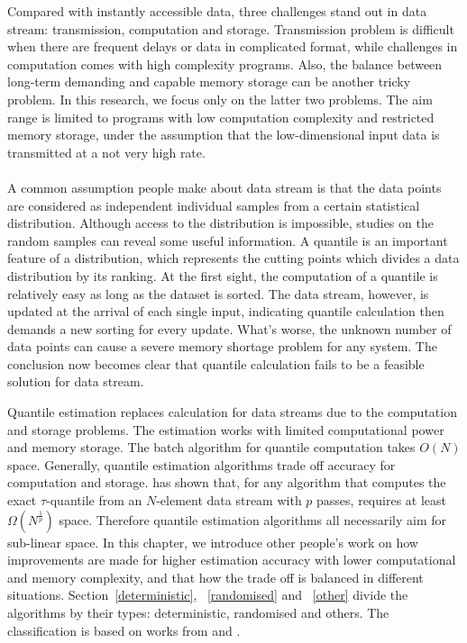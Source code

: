 Compared with instantly accessible data, three challenges stand out in data stream: transmission, computation and storage\cite{muthukrishnanDataStreamsAlgorithms2005}.
Transmission problem is difficult when there are frequent delays or data in complicated format,
while challenges in computation comes with high complexity programs. Also, the balance between long-term demanding and capable memory storage can be another tricky problem.
In this research, we focus only on the latter two problems. The aim range is limited to programs with low computation complexity and restricted memory storage, under the assumption that the low-dimensional input data is transmitted at a not very high rate.
\\\\
A common assumption people make about data stream is that the data points are considered as independent individual samples from a certain statistical distribution. 
Although access to the distribution is impossible, studies on the random samples can reveal some useful information. 
A quantile is an important feature of a distribution, which represents the cutting points which divides a data distribution by its ranking.
At the first sight, the computation of a quantile is relatively easy as long as the dataset is sorted.
The data stream, however, is updated at the arrival of each single input, indicating quantile calculation then demands a new sorting for every update.
What's worse, the unknown number of data points can cause a severe memory shortage problem for any system. 
The conclusion now becomes clear that quantile calculation fails to be a feasible solution for data stream.

Quantile estimation replaces calculation for data streams due to the computation and storage problems.
The estimation works with limited computational power and memory storage.
The batch algorithm for quantile computation takes $O(N)$ space.
Generally, quantile estimation algorithms trade off accuracy for computation and storage.
\citeauthor{munroSelectionSortingLimited1980} \cite{munroSelectionSortingLimited1980} has shown that, for any algorithm that computes the exact $\tau$-quantile from an $N$-element data stream with $p$ passes, requires at least $\Omega(N^{\frac{1}{p}})$ space.
Therefore quantile estimation algorithms all necessarily aim for sub-linear space.
In this chapter, we introduce other people's work on how improvements are made for higher estimation accuracy with lower computational and memory complexity, and that how the trade off is balanced in different situations. Section~\ref{deterministic}, ~\ref{randomised} and ~\ref{other} divide the algorithms by their types: deterministic, randomised and others. The classification is based on works from \citeauthor{buragohainQuantilesStreams2009}\cite{buragohainQuantilesStreams2009} and \citeauthor{wangQuantilesDataStreams2013}\cite{wangQuantilesDataStreams2013}.

